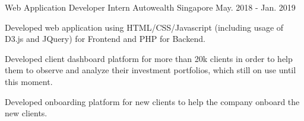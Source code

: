\begin{cventries}

  \cventry
    {Web Application Developer Intern} %
    {Autowealth} %
    {Singapore} %
    {May. 2018 - Jan. 2019} %
    {
      \begin{cvitems} %
        \item {Developed web application using HTML/CSS/Javascript (including usage of D3.js and JQuery) for Frontend and PHP for Backend.}
        \item {Developed client dashboard platform for more than 20k clients in order to help them to observe and analyze their investment portfolios, which still on use until this moment.}
        \item {Developed onboarding platform for new clients to help the company onboard the new clients.}
      \end{cvitems}
    }

\end{cventries}
